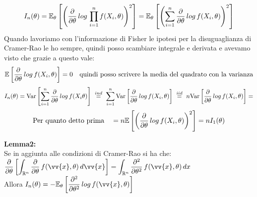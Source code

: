 \begin{Dim}[Lemma1]
    \[
    I_n(\theta)=\mathbb E_{\theta}\left[\left(\dfrac{\partial}{\partial\theta}\,log\, \prod\limits_{i=1}^{n} f(X_i, \theta)\right)^2\right] = \mathbb E_{\theta}\left[\left( \sum\limits_{i=1}^{n} \dfrac{\partial}{\partial\theta}\,log\,  f(X_i, \theta)\right)^2\right]  \]
    Quando lavoriamo con l'informazione di Fisher le ipotesi per la disuguaglianza di Cramer-Rao le ho sempre, quindi posso scambiare integrale e derivata e avevamo visto che grazie a questo vale:
    \[\mathbb{E} \left[  \dfrac{\partial }{\partial \theta} \, log\, f(X_i,\theta)  \right]=0 \ \ \text{ quindi posso scrivere la media del quadrato con la varianza}\]
    \[
    I_n(\theta)= \text{Var} \left[ \sum\limits_{i=1}^{n} \dfrac{\partial}{\partial\theta}\,log\,  f(X_i\theta) \right] \ \overset{ind}{ = } \  \sum\limits_{i=1}^{n}\text{Var} \left[  \dfrac{\partial}{\partial\theta}\,log\,  f(X_i,\theta) \right] \ \overset{iid}{ = } \ n \text{Var} \left[ \dfrac{\partial}{\partial\theta}\,log\,  f(X_i,\theta) \right] =
    \]
    \[ \text{Per quanto detto prima } \ \ = n \E{ \O \frac{\partial}{\partial\theta}\,log\,  f(X_i,\theta)\C^2 } = n I_1(\theta) \]
\end{Dim}


\textbf{Lemma2:}\\
Se in aggiunta alle condizioni di Cramer-Rao si ha che: \ \ $ \frac{\partial }{\partial \theta} \OO \int_{\R^n} \frac{\partial }{\partial \theta} \, f(\vv{x}, \theta) \, d\vv{x}  \CC = \int_{\R^n} \frac{\partial^2}{\partial\theta^2}\, f(\vv{x},\theta)\, dx$\\
Allora $I_n(\theta) = - \EE_{\theta} \OO \frac{\partial^2}{\partial\theta^2}\, log \, f(\vv{x},\theta) \CC$\\




